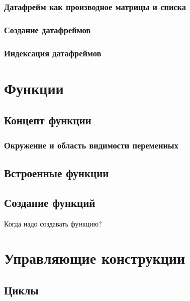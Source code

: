 \documentclass[
  letterpaper,
  DIV=11,
  numbers=noendperiod]{scrreprt}
\theoremstyle{definition}
\theoremstyle{remark}
\begin{document}
\subsection{Датафрейм как производное матрицы и
списка}\label{rdstructs-dataframes-list-matris-child}

\subsection{Создание датафреймов}\label{rdstructs-dataframes-creation}

\subsection{Индексация датафреймов}\label{rdstructs-dataframes-indexing}


\chapter{Функции}\label{rfuncs}

\section{Концепт функции}\label{rfuncs-concept}

\subsection{Окружение и область видимости
переменных}\label{rfuncs-environment}

\section{Встроенные функции}\label{rfuncs-built}

\section{Создание функций}\label{rfuncs-custom}

Когда надо создавать функцию?


\chapter{Управляющие конструкции}\label{controlflow}

\section{Циклы}\label{controlflow-forwhile}
\end{document}
